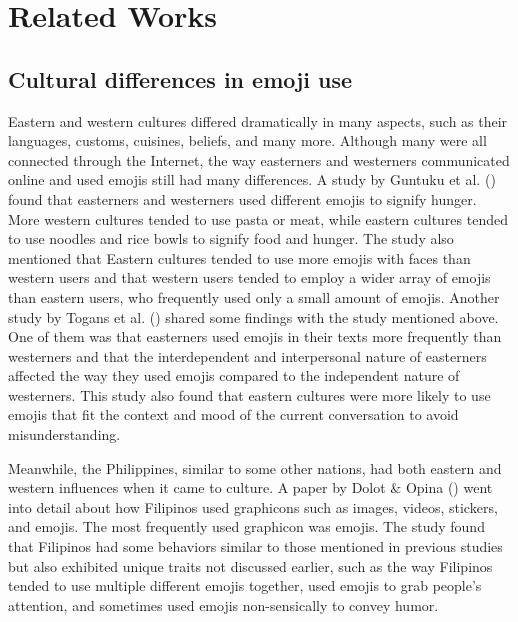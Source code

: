 %
%
%                 



\chapter{Related Works}
\label{sec:relatedworks}
\section{Cultural differences in emoji use}

Eastern and western cultures differed dramatically in many aspects, such as their languages, customs, cuisines, beliefs, and many more. Although many were all connected through the Internet, the way easterners and westerners communicated online and used emojis still had many differences. A study by Guntuku et al. (\citeyear{Guntuku2019}) found that easterners and westerners used different emojis to signify hunger. More western cultures tended to use pasta or meat, while eastern cultures tended to use noodles and rice bowls to signify food and hunger. The study also mentioned that Eastern cultures tended to use more emojis with faces than western users and that western users tended to employ a wider array of emojis than eastern users, who frequently used only a small amount of emojis. Another study by Togans et al. (\citeyear{TOGANS2021277}) shared some findings with the study mentioned above. One of them was that easterners used emojis in their texts more frequently than westerners and that the interdependent and interpersonal nature of easterners affected the way they used emojis compared to the independent nature of westerners. This study also found that eastern cultures were more likely to use emojis that fit the context and mood of the current conversation to avoid misunderstanding.

Meanwhile, the Philippines, similar to some other nations, had both eastern and western influences when it came to culture. A paper by Dolot \& Opina (\citeyear{Dolot2021}) went into detail about how Filipinos used graphicons such as images, videos, stickers, and emojis. The most frequently used graphicon was emojis. The study found that Filipinos had some behaviors similar to those mentioned in previous studies but also exhibited unique traits not discussed earlier, such as the way Filipinos tended to use multiple different emojis together, used emojis to grab people’s attention, and sometimes used emojis non-sensically to convey humor.

